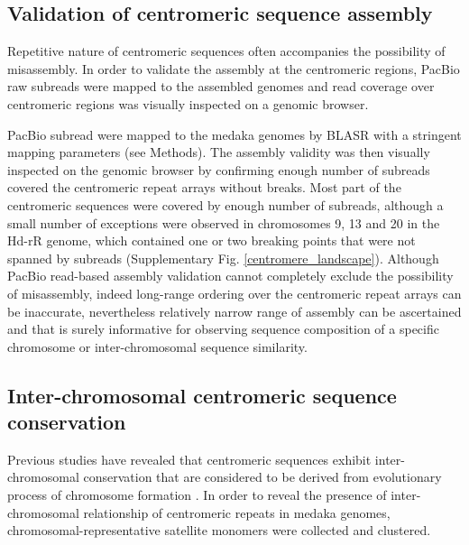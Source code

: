 \subsection*{Validation of centromeric sequence assembly}
  Repetitive nature of centromeric sequences often accompanies the possibility of misassembly. In order to validate the assembly at the centromeric regions, PacBio raw subreads were mapped to the assembled genomes and read coverage over centromeric regions was visually inspected on a genomic browser.


  PacBio subread were mapped to the medaka genomes by BLASR \cite{} with a stringent mapping parameters (see Methods). The assembly validity was then visually inspected on the genomic browser by confirming enough number of subreads covered the centromeric repeat arrays without breaks. Most part of the centromeric sequences were covered by enough number of subreads, although a small number of exceptions were observed in chromosomes 9, 13 and 20 in the Hd-rR genome, which contained one or two breaking points that were not spanned by subreads (Supplementary Fig. \ref{centromere_landscape}). Although PacBio read-based assembly validation cannot completely exclude the possibility of misassembly, indeed long-range ordering over the centromeric repeat arrays can be inaccurate, nevertheless relatively narrow range of assembly can be ascertained and that is surely informative for observing sequence composition of a specific chromosome or inter-chromosomal sequence similarity.


\subsection*{Inter-chromosomal centromeric sequence conservation}
  Previous studies have revealed that centromeric sequences exhibit inter-chromosomal conservation that are considered to be derived from evolutionary process of chromosome formation \cite{}. In order to reveal the presence of inter-chromosomal relationship of centromeric repeats in medaka genomes, chromosomal-representative satellite monomers were collected and clustered.

